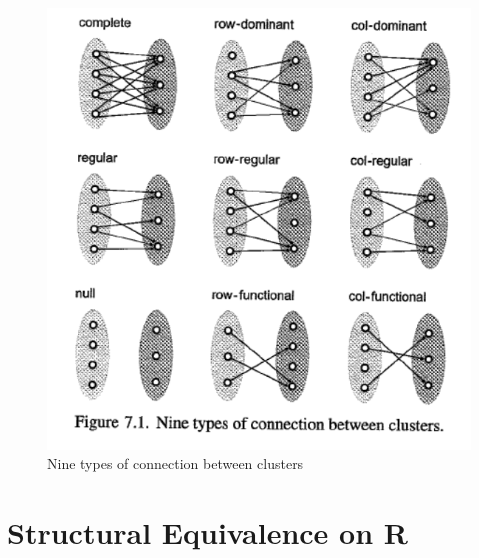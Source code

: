 \documentclass[
  notitlepage,
  onecolumn,
  openany]{book}
\begin{document}
\begin{figure}[h!]

{\centering \includegraphics[width=0.5\linewidth]{images/11-Subgroups and Structural Equivalence/Untitled 5} 

}

\caption{Nine types of connection between clusters}\label{fig:unnamed-chunk-85}
\end{figure}

\hypertarget{structural-equivalence-on-r}{%
\section{Structural Equivalence on R}\label{structural-equivalence-on-r}}
\end{document}
